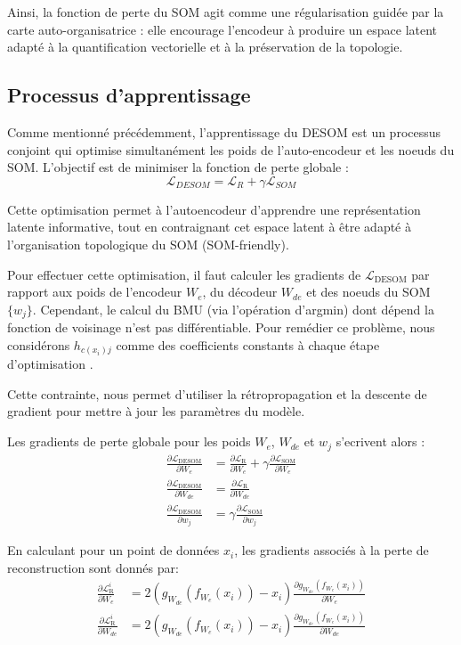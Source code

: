 \documentclass[12pt,a4paper]{report}
\begin{document}
Ainsi, la fonction de perte du SOM agit comme une régularisation guidée par la carte auto-organisatrice : elle encourage l'encodeur à produire un espace latent adapté à la quantification 
vectorielle et à la préservation de la topologie.

\subsection{Processus d'apprentissage}

Comme mentionné précédemment, l'apprentissage du DESOM est un processus conjoint qui optimise simultanément les poids de l'auto-encodeur et les noeuds du SOM.
L'objectif est de minimiser la fonction de perte globale :
$$\mathcal{L}_{DESOM} = \mathcal{L}_{R} + \gamma \mathcal{L}_{SOM}$$

Cette optimisation permet à l'autoencodeur d'apprendre une représentation latente informative, 
tout en contraignant cet espace latent à être adapté à l'organisation topologique du SOM (SOM-friendly).

Pour effectuer cette optimisation, il faut calculer les gradients de $\mathcal{L}_{\text{DESOM}}$ par rapport aux poids de l'encodeur $W_e$, du décodeur $W_{de}$ et des noeuds du SOM $\{w_j\}$.
Cependant, le calcul du BMU (via l'opération d'argmin) dont dépend la fonction de voisinage n'est pas différentiable. Pour remédier ce problème,
nous considérons $h_{c(x_i) j}$ comme des coefficients constants à chaque étape d'optimisation \cite{DESOM}.

Cette contrainte, nous permet d'utiliser la rétropropagation et la descente de gradient pour mettre à jour les paramètres du modèle.

Les gradients de perte globale pour les poids $W_e$, $W_{de}$ et $w_j$ s'ecrivent alors \cite{DESOM}:
\begin{align*}
\frac{\partial \mathcal{L}_{\text{DESOM}}}{\partial W_e} &= \frac{\partial \mathcal{L}_{\text{R}}}{\partial W_e} + \gamma \frac{\partial \mathcal{L}_{\text{SOM}}}{\partial W_e} \\
\frac{\partial \mathcal{L}_{\text{DESOM}}}{\partial W_{de}} &= \frac{\partial \mathcal{L}_{\text{R}}}{\partial W_{de}} \\
\frac{\partial \mathcal{L}_{\text{DESOM}}}{\partial w_j} &= \gamma \frac{\partial \mathcal{L}_{\text{SOM}}}{\partial w_j}
\end{align*}

En calculant pour un point de données $x_i$, les gradients associés à la perte de reconstruction sont donnés par:
\begin{align*}
\frac{\partial \mathcal{L}_{\text{R}}^i}{\partial W_e} &= 2(g_{W_{de}}(f_{W_e}(x_i)) - x_i) \frac{\partial g_{W_{de}}(f_{W_e}(x_i))}{\partial W_e} \\
\frac{\partial \mathcal{L}_{\text{R}}^i}{\partial W_{de}} &= 2(g_{W_{de}}(f_{W_e}(x_i)) - x_i) \frac{\partial g_{W_{de}}(f_{W_e}(x_i))}{\partial W_{de}} \\
\end{align*}
\end{document}
